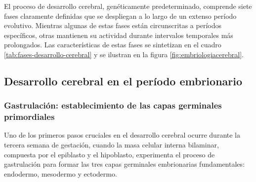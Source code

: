 \documentclass[11pt,letterpaper]{report}
\begin{document}
El proceso de desarrollo cerebral, genéticamente predeterminado, comprende
siete fases claramente definidas que se despliegan a lo largo de un extenso
período evolutivo. \cite{Kolb7} Mientras algunas de estas fases están
circunscritas a períodos específicos, otras mantienen su actividad durante
intervalos temporales más prolongados. Las características de estas fases se
sintetizan en el cuadro \ref{tab:fases-desarrollo-cerebral} y se ilustran en la
figura \ref{fig:embriologiacerebral}. 

\begin{table}[htbp]
\caption{Siete fases del desarrollo cerebral}
\label{tab:fases-desarrollo-cerebral}
\end{table}

\subsection{Desarrollo cerebral en el período embrionario}
\subsubsection{Gastrulación: establecimiento de las capas germinales primordiales}
Uno de los primeros pasos cruciales en el desarrollo cerebral ocurre durante la
tercera semana de gestación, cuando la masa celular interna bilaminar,
compuesta por el epiblasto y el hipoblasto, experimenta el proceso de
gastrulación para formar las tres capas germinales embrionarias fundamentales:
endodermo, mesodermo y ectodermo. \cite{Polin124}
\end{document}
